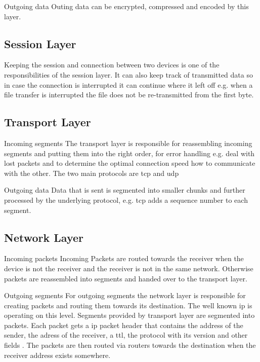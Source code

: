 Outgoing data\newline
Outing data can be encrypted, compressed and encoded by this layer.

\subsection{Session Layer}
Keeping the session and connection between two devices is one of the responsibilities of the session layer. It can also keep track of transmitted data so in case the connection is interrupted it can continue where it left off e.g. when a file transfer is interrupted the file does not be re-transmitted from the first byte. 

\subsection{Transport Layer}
Incoming segments\newline
The transport layer is responsible for reassembling incoming segments and putting them into the right order, for error handling e.g. deal with lost packets and to determine the optimal connection speed how to communicate with the other. 
The two main protocols are \gls{tcp} and \gls{udp}

Outgoing data\newline
Data that is sent is segmented into smaller chunks and further processed by the underlying protocol, e.g. \gls{tcp} adds a sequence number to each segment.

\subsection{Network Layer}
Incoming packets\newline
Incoming Packets are routed towards the receiver when the device is not the receiver and the receiver is not in the same network. Otherwise packets are  reassembled into segments and handed over to the transport layer.

Outgoing segments\newline
For outgoing segments the network layer is responsible for creating packets and routing them towards its destination.
The well known \gls{ip} is operating on this level. Segments provided by transport layer  are segmented into packets. Each packet gets a \gls{ip} packet header that contains the address of the sender, the adress of the receiver, a \gls{ttl}, the protocol with its version and other fields \cite{rfc791-ip}. The packets are then routed via routers towards the destination when the receiver address exists somewhere.


